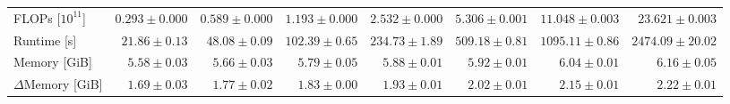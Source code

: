 \begin{tabular}{lrrrrrrr}
\quad FLOPs [$10^{11}$] & $0.293 \pm 0.000$ & $0.589 \pm 0.000$ & $1.193 \pm 0.000$ & $2.532 \pm 0.000$ & $5.306 \pm 0.001$ & $11.048 \pm 0.003$ & $23.621 \pm 0.003$ \\
\quad Runtime [s] & $21.86 \pm 0.13$ & $48.08 \pm 0.09$ & $102.39 \pm 0.65$ & $234.73 \pm 1.89$ & $509.18 \pm 0.81$ & $1095.11 \pm 0.86$ & $2474.09 \pm 20.02$ \\
\quad Memory [GiB] & $5.58 \pm 0.03$ & $5.66 \pm 0.03$ & $5.79 \pm 0.05$ & $5.88 \pm 0.01$ & $5.92 \pm 0.01$ & $6.04 \pm 0.01$ & $6.16 \pm 0.05$ \\
\quad $\Delta$Memory [GiB] & $1.69 \pm 0.03$ & $1.77 \pm 0.02$ & $1.83 \pm 0.00$ & $1.93 \pm 0.01$ & $2.02 \pm 0.01$ & $2.15 \pm 0.01$ & $2.22 \pm 0.01$ \\
\bottomrule
\end{tabular}
